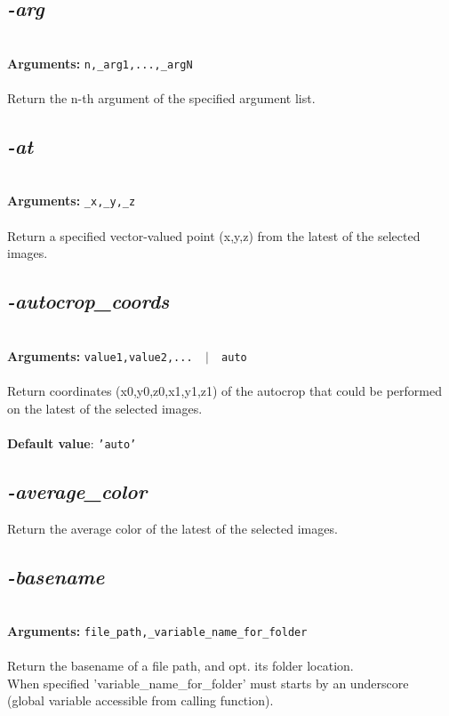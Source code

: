 \documentclass[a4paper,11pt,twoside]{book}
\begin{document}
\subsection{\emph{-arg} }\vspace*{-0.5em}
~\\\textbf{Arguments: } 
{\small \texttt{n,\_arg1,...,\_argN}}\\~\\
Return the n-th argument of the specified argument list.


\subsection{\emph{-at} }\vspace*{-0.5em}
~\\\textbf{Arguments: } 
{\small \texttt{\_x,\_y,\_z}}\\~\\
Return a specified vector-valued point (x,y,z) from the latest of the selected images.


\subsection{\emph{-autocrop\_coords} }\vspace*{-0.5em}
~\\\textbf{Arguments: } 
{\small \texttt{value1,value2,... ~$|$~ auto}}\\~\\
Return coordinates (x0,y0,z0,x1,y1,z1) of the autocrop that could be performed on the latest of the selected images.
~\\~\\\textbf{Default value}: {\small \texttt{'auto'}}


\subsection{\emph{-average\_color} }\vspace*{-0.5em}
Return the average color of the latest of the selected images.


\subsection{\emph{-basename} }\vspace*{-0.5em}
~\\\textbf{Arguments: } 
{\small \texttt{file\_path,\_variable\_name\_for\_folder}}\\~\\
Return the basename of a file path, and opt. its folder location.
~\\When specified 'variable\_name\_for\_folder' must starts by an underscore
~\\(global variable accessible from calling function).
\end{document}
